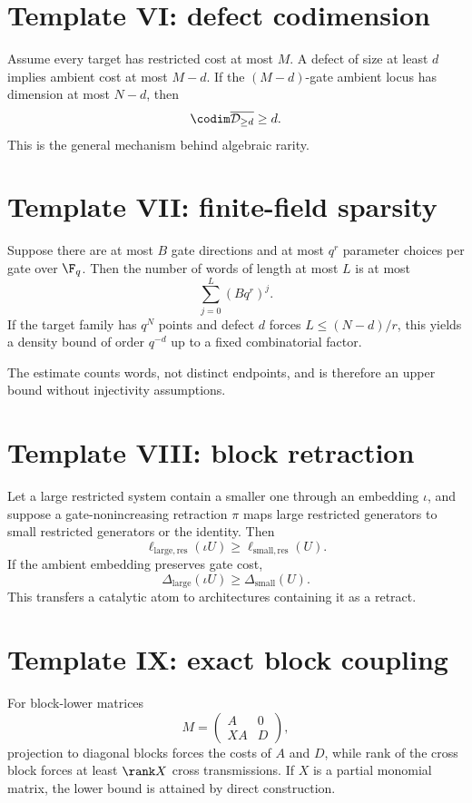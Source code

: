 \section{Template VI: defect codimension}
Assume every target has restricted cost at most $M$.  A defect of size at least $d$ implies ambient cost at most $M-d$.  If the $(M-d)$-gate ambient locus has dimension at most $N-d$, then
\[
\codim\overline{\mathcal D_{\ge d}}\ge d.
\]
This is the general mechanism behind algebraic rarity.

\section{Template VII: finite-field sparsity}
Suppose there are at most $B$ gate directions and at most $q^r$ parameter choices per gate over $\F_q$.  Then the number of words of length at most $L$ is at most
\[
\sum_{j=0}^L(Bq^r)^j.
\]
If the target family has $q^N$ points and defect $d$ forces $L\le (N-d)/r$, this yields a density bound of order $q^{-d}$ up to a fixed combinatorial factor.

The estimate counts words, not distinct endpoints, and is therefore an upper bound without injectivity assumptions.

\section{Template VIII: block retraction}
Let a large restricted system contain a smaller one through an embedding $\iota$, and suppose a gate-nonincreasing retraction $\pi$ maps large restricted generators to small restricted generators or the identity.  Then
\[
\ell_{\mathrm{large,res}}(\iota U)
\ge
\ell_{\mathrm{small,res}}(U).
\]
If the ambient embedding preserves gate cost,
\[
\Delta_{\mathrm{large}}(\iota U)
\ge
\Delta_{\mathrm{small}}(U).
\]
This transfers a catalytic atom to architectures containing it as a retract.

\section{Template IX: exact block coupling}
For block-lower matrices
\[
M=
\begin{pmatrix}
A&0\\
XA&D
\end{pmatrix},
\]
projection to diagonal blocks forces the costs of $A$ and $D$, while rank of the cross block forces at least $\rank X$ cross transmissions.  If $X$ is a partial monomial matrix, the lower bound is attained by direct construction.

